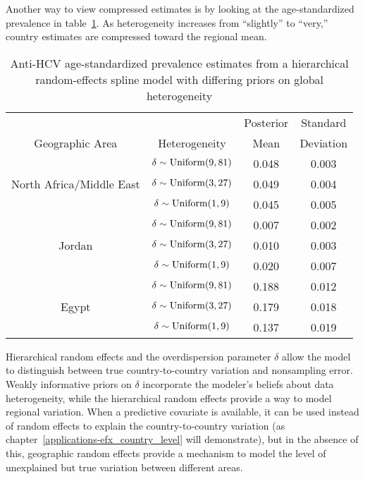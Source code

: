 Another way to view compressed estimates is by looking at the
age-standardized prevalence in table~\ref{tab:app-hepc global rfx}.
As heterogeneity increases from ``slightly'' to ``very,'' country
estimates are compressed toward the regional mean.

    \begin{table}[h]
        \caption{Anti-HCV age-standardized prevalence estimates
          from a hierarchical random-effects spline model with differing
          priors on global heterogeneity}
        \label{tab:app-hepc global rfx}
        \begin{center}
        \begin{tabular}{|c|c|c|c|}
            \hline
                & & Posterior & Standard \\
                Geographic Area & Heterogeneity & Mean & Deviation \\
            \hline
                & $\delta \sim \operatorname{Uniform}(9,81)$ & 0.048 & 0.003 \\
                North Africa/Middle East & $\delta \sim \operatorname{Uniform}(3,27)$ & 0.049 & 0.004 \\
                & $\delta \sim \operatorname{Uniform}(1,9)$ & 0.045 & 0.005 \\
            \hline
                & $\delta \sim \operatorname{Uniform}(9,81)$ & 0.007 & 0.002 \\
                Jordan & $\delta \sim \operatorname{Uniform}(3,27)$ & 0.010 & 0.003 \\
                & $\delta \sim \operatorname{Uniform}(1,9)$ & 0.020 & 0.007 \\
            \hline
                & $\delta \sim \operatorname{Uniform}(9,81)$ & 0.188 & 0.012 \\
                Egypt & $\delta \sim \operatorname{Uniform}(3,27)$ & 0.179 & 0.018 \\
                & $\delta \sim \operatorname{Uniform}(1,9)$ & 0.137 & 0.019 \\
            \hline
        \end{tabular}
        \end{center}
    \end{table}

Hierarchical random effects and the overdispersion parameter
$\delta$ allow the model to distinguish between true
country-to-country variation and nonsampling error.  Weakly
informative priors on $\delta$ incorporate the modeler's beliefs about
data heterogeneity, while the hierarchical random effects provide a way
to model regional variation.  When a predictive covariate is
available, it can be used instead of random effects to explain the
country-to-country variation (as
chapter~\ref{applications-efx_country_level} will demonstrate), but in
the absence of this, geographic random effects provide a mechanism to
model the level of unexplained but true variation between different
areas.

